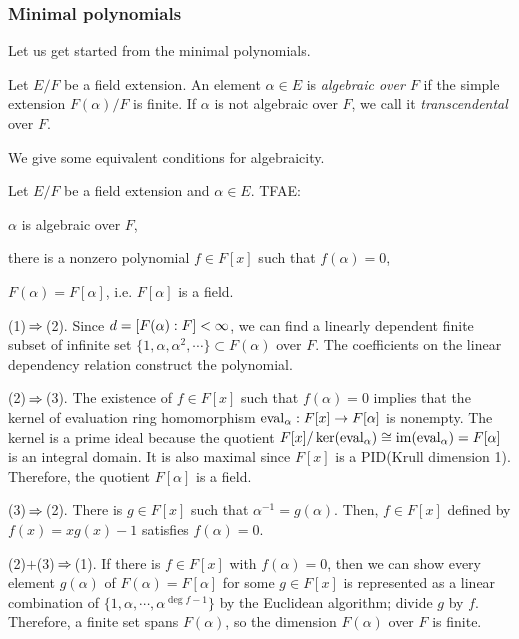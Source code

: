 \documentclass{../exp}
\begin{document}
\subsubsection{Minimal polynomials}
Let us get started from the minimal polynomials.

\begin{defn}
Let $E/F$ be a field extension.
An element $\alpha\in E$ is \emph{algebraic over $F$} if the simple extension $F(\alpha)/F$ is finite.
If $\alpha$ is not algebraic over $F$, we call it \emph{transcendental} over $F$.
\end{defn}

We give some equivalent conditions for algebraicity.
\begin{thm}
Let $E/F$ be a field extension and $\alpha\in E$.
TFAE:
\begin{cond}
\item $\alpha$ is algebraic over $F$,
\item there is a nonzero polynomial $f\in F[x]$ such that $f(\alpha)=0$,
\item $F(\alpha)=F[\alpha]$, i.e. $F[\alpha]$ is a field.
\end{cond}
\end{thm}
\begin{pf}
(1)$\impl$(2).
Since $d=[F(\alpha):F]<\infty$, we can find a linearly dependent finite subset of infinite set $\{1,\alpha,\alpha^2,\cdots\}\subset F(\alpha)$ over $F$.
The coefficients on the linear dependency relation construct the polynomial.

(2)$\impl$(3).
The existence of $f\in F[x]$ such that $f(\alpha)=0$ implies that the kernel of evaluation ring homomorphism $\eval_\alpha:F[x]\to F[\alpha]$ is nonempty.
The kernel is a prime ideal because the quotient $F[x]/\ker(\operatorname{eval}_\alpha)\cong\operatorname{im}(\operatorname{eval}_\alpha)=F[\alpha]$ is an integral domain.
It is also maximal since $F[x]$ is a PID(Krull dimension 1).
Therefore, the quotient $F[\alpha]$ is a field.

(3)$\impl$(2).
There is $g\in F[x]$ such that $\alpha^{-1}=g(\alpha)$.
Then, $f\in F[x]$ defined by $f(x)=xg(x)-1$ satisfies $f(\alpha)=0$.

(2)$+$(3)$\impl$(1).
If there is $f\in F[x]$ with $f(\alpha)=0$, then we can show every element $g(\alpha)$ of $F(\alpha)=F[\alpha]$ for some $g\in F[x]$ is represented as a linear combination of $\{1,\alpha,\cdots,\alpha^{\deg f-1}\}$ by the Euclidean algorithm; divide $g$ by $f$.
Therefore, a finite set spans $F(\alpha)$, so the dimension $F(\alpha)$ over $F$ is finite.
\end{pf}
\end{document}
